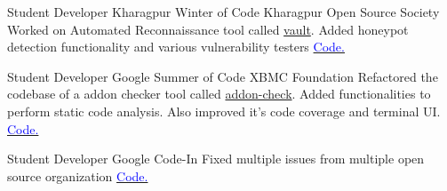     {Student Developer}
    {Kharagpur Winter of Code}
    {Kharagpur Open Source Society}
    {}
    {
        Worked on Automated Reconnaissance tool called \href{https://github.com/abhisharma404/vault}{vault}. Added honeypot detection functionality and various vulnerability testers
        \hfill
        \href{https://github.com/abhisharma404/vault/commits?author=mzfr}{\textcolor{blue}{\scriptsize Code.}}
    }
    \vspace*{0.2\baselineskip}

    {Student Developer}
    {Google Summer of Code}
    {XBMC Foundation}
    {}
    {
        Refactored the codebase of a addon checker tool called \href{https://github.com/xbmc/addon-check/}{addon-check}. Added functionalities to perform static code analysis. Also improved  it's code coverage and terminal UI.
        \hfill
        \href{https://github.com/xbmc/addon-check/commits?author=mzfr}{\textcolor{blue}{\scriptsize Code.}}
    }
    \vspace*{0.2\baselineskip}

    {Student Developer}
    {Google Code-In}
    {}
    {
        Fixed multiple issues from multiple open source organization
        \hfill
        \href{https://codein.withgoogle.com/archive/search/?q=mehtab\%20zafar}{\textcolor{blue}{\scriptsize Code.}}
    }
    \vspace*{0.2\baselineskip}
